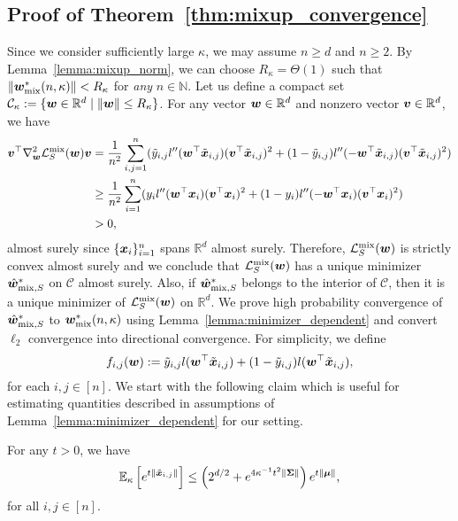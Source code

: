 \subsection{Proof of Theorem~\ref{thm:mixup_convergence}}
Since we consider sufficiently large $\kappa$, we may assume $n \geq d$ and $n\geq 2$.
By Lemma~\ref{lemma:mixup_norm}, we can choose $R_\kappa = \Theta(1)$ such that $\lVert {\bm{w}}^*_\mathrm{mix}(n,\kappa) \rVert < R_\kappa$ for \emph{any} $n\in \mathbb{N}$. Let us define a compact set $\mathcal{C}_\kappa:= \{{\bm{w}} \in \mathbb{R}^d \mid \lVert {\bm{w}} \rVert \leq R_\kappa\}$. For any vector ${\bm{w}}\in \mathbb{R}^d$ and nonzero vector ${\bm{v}} \in \mathbb{R}^d$, we have
\begin{align*}
    {\bm{v}}^\top \nabla^2_{\bm{w}} \mathcal{L}_S^\mathrm{mix} ({\bm{w}}) {\bm{v}} &= \frac{1}{n^2} \sum_{i,j=1}^n (\tilde{y}_{i,j} l''({\bm{w}}^\top \tilde{{\bm{x}}}_{i,j})({\bm{v}}^\top \tilde{{\bm{x}}}_{i,j})^2 +  (1-\tilde{y}_{i,j})l''(-{\bm{w}}^\top \tilde{{\bm{x}}}_{i,j})({\bm{v}}^\top \tilde{{\bm{x}}}_{i,j})^2)\\
    &\geq \frac{1}{n^2} \sum_{i=1}^n (y_i l''({\bm{w}}^\top {\bm{x}}_i)({\bm{v}}^\top {\bm{x}}_i)^2 +  (1-y_i)l''(-{\bm{w}}^\top {\bm{x}}_i)({\bm{v}}^\top {\bm{x}}_i)^2)\\
    &>0,
\end{align*}
almost surely since $\{ {\bm{x}}_i\}_{i=1}^n $ spans $\mathbb{R}^d$ almost surely. Therefore, $\mathcal{L}_S^\mathrm{mix}({\bm{w}})$ is strictly convex almost surely and we conclude that  $\mathcal{L}_S^\mathrm{mix}({\bm{w}})$ has a unique minimizer $\hat{{\bm{w}}}_{\mathrm{mix}, S}^*$ on $\mathcal{C}$ almost surely. Also, if $\hat{{\bm{w}}}_{\mathrm{mix},S}^*$ belongs to the interior of $\mathcal{C}$, then it is a unique minimizer of $\mathcal{L}_S^\mathrm{mix}({\bm{w}})$ on $\mathbb{R}^d$. We prove high probability convergence of $\hat{{\bm{w}}}_{\mathrm{mix}, S}^*$ to ${\bm{w}}^*_\mathrm{mix}(n,\kappa)$ using Lemma~\ref{lemma:minimizer_dependent} and convert $\ell_2$ convergence into directional convergence.
For simplicity, we define
\begin{equation*}
f_{i,j}({\bm{w}}) := \tilde{y}_{i,j}l({\bm{w}}^\top \tilde{{\bm{x}}}_{i,j}) + (1-\tilde{y}_{i,j}) l({\bm{w}}^\top \tilde{{\bm{x}}}_{i,j}),
\end{equation*}
for each $i,j\in[n]$. We start with the following claim which is useful for estimating quantities described in assumptions of Lemma~\ref{lemma:minimizer_dependent} for our setting.
\begin{claim}\label{claim:mix}
For any $t>0$, we have
\begin{equation*}
\mathbb{E}_\kappa \left[ e^{t \lVert \tilde{{\bm{x}}}_{i,j} \rVert}\right] \leq \left( 2^{d/2} + e^{4\kappa^{-1}t^2 \lVert {\bm{\Sigma}} \rVert}\right)e^{t\lVert {\bm{\mu}} \rVert},
\end{equation*}
for all $i,j \in [n]$.
\end{claim}
